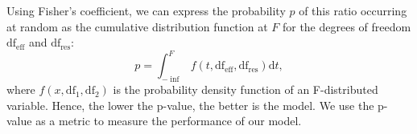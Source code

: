 Using Fisher's coefficient, we can express the probability $p$ of this ratio occurring at random as the cumulative distribution function at $F$ for the degrees of freedom $\text{df}_\text{eff}$ and $\text{df}_\text{res}$:
\begin{equation}
	p = \int_{-\inf}^F f(t,\text{df}_\text{eff},\text{df}_\text{res}) \mathrm{d}t,
\end{equation}
where $f(x,\text{df}_1,\text{df}_2)$ is the probability density function of an F-distributed variable. Hence, the lower the p-value, the better is the model. We use the p-value as a metric to measure the performance of our model.
